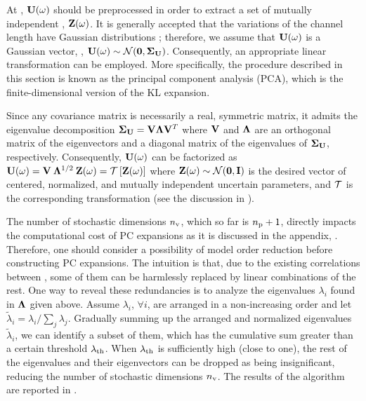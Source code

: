 At , $\mathbf{U}(\omega)$ should be preprocessed in order to extract a set of mutually independent \rvs, $\mathbf{Z}(\omega)$. It is generally accepted that the variations of the channel length have Gaussian distributions \cite{srivastava2010, juan2011, juan2012}; therefore, we assume that $\mathbf{U}(\omega)$ is a Gaussian vector, \ie, $\vU(\o) \sim \normal(\vZero, \mCov_\vU)$. Consequently, an appropriate linear transformation can be employed. More specifically, the procedure described in this section is known as the principal component analysis (PCA), which is the finite-dimensional version of the KL expansion.

Since any covariance matrix is necessarily a real, symmetric matrix, it admits the eigenvalue decomposition \cite{press2007} $\mCov_\vU = \m{V} \m{\Lambda} \m{V}^T$ where $\m{V}$ and $\m{\Lambda}$ are an orthogonal matrix of the eigenvectors and a diagonal matrix of the eigenvalues of $\mCov_\vU$, respectively. Consequently, $\mathbf{U}(\omega)$ can be factorized as $\vU(\o) = \m{V} \: \m{\Lambda}^{1/2} \: \vZ(\o) = \oTransform{\vZ(\o)}$ where $\vZ(\o) \sim \normal(\vZero, \mI)$ is the desired vector of centered, normalized, and mutually independent uncertain parameters, and $\oTransform$ is the corresponding transformation (see the discussion in ).

The number of stochastic dimensions ${n_\text{v}}$, which so far is ${n_\text{p}} + 1$, directly impacts the computational cost of PC expansions as it is discussed in the appendix, . Therefore, one should consider a possibility of model order reduction before constructing PC expansions. The intuition is that, due to the existing correlations between \rvs, some of them can be harmlessly replaced by linear combinations of the rest. One way to reveal these redundancies is to analyze the eigenvalues $\lambda_i$ found in $\m{\Lambda}$ given above. Assume $\lambda_i$, $\forall i$, are arranged in a non-increasing order and let $\tilde{\lambda}_i = \lambda_i / \sum_j \lambda_j$. Gradually summing up the arranged and normalized eigenvalues $\tilde{\lambda}_i$, we can identify a subset of them, which has the cumulative sum greater than a certain threshold $\lambda_\text{th}$. When $\lambda_\text{th}$ is sufficiently high (close to one), the rest of the eigenvalues and their eigenvectors can be dropped as being insignificant, reducing the number of stochastic dimensions ${n_\text{v}}$. The results of the algorithm are reported in .
